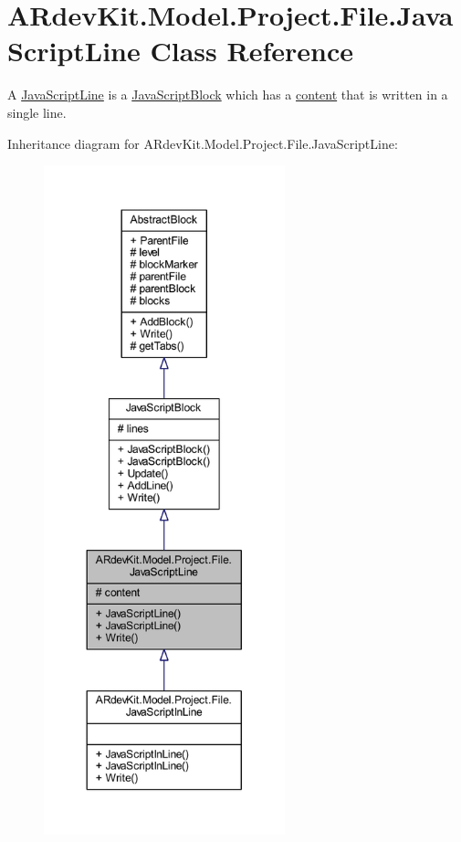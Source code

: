 \hypertarget{class_a_rdev_kit_1_1_model_1_1_project_1_1_file_1_1_java_script_line}{\section{A\-Rdev\-Kit.\-Model.\-Project.\-File.\-Java\-Script\-Line Class Reference}
\label{class_a_rdev_kit_1_1_model_1_1_project_1_1_file_1_1_java_script_line}
}


A \hyperlink{class_a_rdev_kit_1_1_model_1_1_project_1_1_file_1_1_java_script_line}{Java\-Script\-Line} is a \hyperlink{class_a_rdev_kit_1_1_model_1_1_project_1_1_file_1_1_java_script_block}{Java\-Script\-Block} which has a \hyperlink{class_a_rdev_kit_1_1_model_1_1_project_1_1_file_1_1_java_script_line_ac13eaaa9582b295e64a38594f11abb6e}{content} that is written in a single line.  




Inheritance diagram for A\-Rdev\-Kit.\-Model.\-Project.\-File.\-Java\-Script\-Line\-:
\nopagebreak
\begin{figure}[H]
\begin{center}
\leavevmode
\includegraphics[height=550pt]{class_a_rdev_kit_1_1_model_1_1_project_1_1_file_1_1_java_script_line__inherit__graph}
\end{center}
\end{figure}


